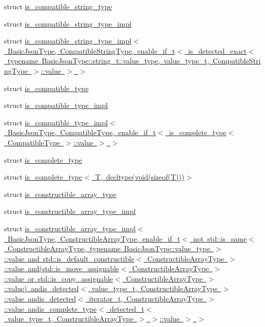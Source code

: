\begin{DoxyCompactItemize}
\item 
struct \mbox{\hyperlink{structnlohmann_1_1detail_1_1is__compatible__string__type}{is\+\_\+compatible\+\_\+string\+\_\+type}}
\item 
struct \mbox{\hyperlink{structnlohmann_1_1detail_1_1is__compatible__string__type__impl}{is\+\_\+compatible\+\_\+string\+\_\+type\+\_\+impl}}
\item 
struct \mbox{\hyperlink{structnlohmann_1_1detail_1_1is__compatible__string__type__impl_3_01BasicJsonType_00_01Compatible494e9dc742c819c61e54b8282030b5b6}{is\+\_\+compatible\+\_\+string\+\_\+type\+\_\+impl$<$ Basic\+Json\+Type, Compatible\+String\+Type, enable\+\_\+if\+\_\+t$<$ is\+\_\+detected\+\_\+exact$<$ typename Basic\+Json\+Type\+::string\+\_\+t\+::value\+\_\+type, value\+\_\+type\+\_\+t, Compatible\+String\+Type $>$\+::value $>$ $>$}}
\item 
struct \mbox{\hyperlink{structnlohmann_1_1detail_1_1is__compatible__type}{is\+\_\+compatible\+\_\+type}}
\item 
struct \mbox{\hyperlink{structnlohmann_1_1detail_1_1is__compatible__type__impl}{is\+\_\+compatible\+\_\+type\+\_\+impl}}
\item 
struct \mbox{\hyperlink{structnlohmann_1_1detail_1_1is__compatible__type__impl_3_01BasicJsonType_00_01CompatibleType_00_fa54cb60e66f5c6ba93b1dd3f418b703}{is\+\_\+compatible\+\_\+type\+\_\+impl$<$ Basic\+Json\+Type, Compatible\+Type, enable\+\_\+if\+\_\+t$<$ is\+\_\+complete\+\_\+type$<$ Compatible\+Type $>$\+::value $>$ $>$}}
\item 
struct \mbox{\hyperlink{structnlohmann_1_1detail_1_1is__complete__type}{is\+\_\+complete\+\_\+type}}
\item 
struct \mbox{\hyperlink{structnlohmann_1_1detail_1_1is__complete__type_3_01T_00_01decltype_07void_07sizeof_07T_08_08_08_4}{is\+\_\+complete\+\_\+type$<$ T, decltype(void(sizeof(\+T)))$>$}}
\item 
struct \mbox{\hyperlink{structnlohmann_1_1detail_1_1is__constructible__array__type}{is\+\_\+constructible\+\_\+array\+\_\+type}}
\item 
struct \mbox{\hyperlink{structnlohmann_1_1detail_1_1is__constructible__array__type__impl}{is\+\_\+constructible\+\_\+array\+\_\+type\+\_\+impl}}
\item 
struct \mbox{\hyperlink{structnlohmann_1_1detail_1_1is__constructible__array__type__impl_3_01BasicJsonType_00_01Construcb751ba39e14100ed41966800a3fcf4db}{is\+\_\+constructible\+\_\+array\+\_\+type\+\_\+impl$<$ Basic\+Json\+Type, Constructible\+Array\+Type, enable\+\_\+if\+\_\+t$<$ not std\+::is\+\_\+same$<$ Constructible\+Array\+Type, typename Basic\+Json\+Type\+::value\+\_\+type $>$\+::value and std\+::is\+\_\+default\+\_\+constructible$<$ Constructible\+Array\+Type $>$\+::value and(std\+::is\+\_\+move\+\_\+assignable$<$ Constructible\+Array\+Type $>$\+::value or std\+::is\+\_\+copy\+\_\+assignable$<$ Constructible\+Array\+Type $>$\+::value) andis\+\_\+detected$<$ value\+\_\+type\+\_\+t, Constructible\+Array\+Type $>$\+::value andis\+\_\+detected$<$ iterator\+\_\+t, Constructible\+Array\+Type $>$\+::value andis\+\_\+complete\+\_\+type$<$ detected\+\_\+t$<$ value\+\_\+type\+\_\+t, Constructible\+Array\+Type $>$ $>$\+::value $>$ $>$}}

\end{DoxyCompactItemize}
